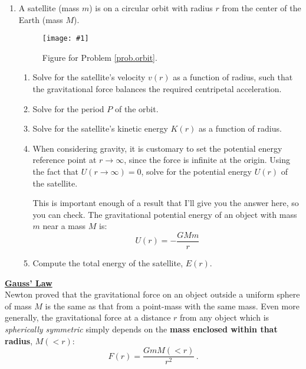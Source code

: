\documentclass[11pt]{article}
\newcommand\plotoneman[2]{\centering \leavevmode
  \texttt{[image: \#1]}}
\renewcommand{\section}[1]{\textbf{\underline{#1}}}
\begin{document}
\begin{enumerate}
\item
  \label{prob.orbit}
  A satellite (mass $m$) is on a circular orbit with radius $r$ from
  the center of the Earth (mass $M$).

  \begin{figure*}[hbt]
    \plotoneman{circular_orbit}{0.4}
    \caption{Figure for Problem \ref{prob.orbit}.}
  \end{figure*}

  \begin{enumerate}
  \item
    \label{prob.orbit.1}
    Solve for the satellite's velocity $v(r)$ as a function of radius,
    such that the gravitational force balances the required
    centripetal acceleration.
  \item
    \label{prob.orbit.2}
    Solve for the period $P$ of the orbit.
  \item
    \label{prob.orbit.3}
    Solve for the satellite's kinetic energy $K(r)$ as a function of
    radius.
  \item
    \label{prob.orbit.4}
    When considering gravity, it is customary to set the potential
    energy reference point at $r\rightarrow\infty$, since the force is
    infinite at the origin. Using the fact that $U(r\rightarrow\infty)
    = 0$, solve for the potential energy $U(r)$ of the satellite.

    This is important enough of a result that I'll give you the answer
    here, so you can check. The gravitational potential energy of an
    object with mass $m$ near a mass $M$ is:
    \begin{equation}
      U(r) = -\frac{GMm}{r} \label{eq.grav_pot}
    \end{equation}
  \item
    \label{prob.orbit.5}
    Compute the total energy of the satellite, $E(r)$.
  \end{enumerate}

\end{enumerate}

\section{Gauss' Law}\\

Newton proved that the gravitational force on an object outside a
uniform sphere of mass $M$ is the same as that from a point-mass with
the same mass. Even more generally, the gravitational force
at a distance $r$ from any object which is \textit{spherically
  symmetric} simply depends on the \textbf{mass enclosed within that radius},
$M(<r)$:
\begin{equation}
  F(r) = \frac{GmM(<r)}{r^2}\,.
\end{equation}
\end{document}
